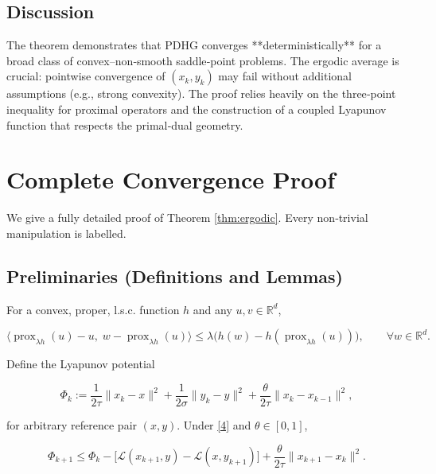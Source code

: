 \documentclass{article}
\begin{document}
\subsection*{Discussion}
The theorem demonstrates that PDHG converges **deterministically** for a broad class of convex–non‑smooth saddle‑point problems. The ergodic average is crucial: pointwise convergence of \((x_{k},y_{k})\) may fail without additional assumptions (e.g., strong convexity). The proof relies heavily on the three‑point inequality for proximal operators and the construction of a coupled Lyapunov function that respects the primal‑dual geometry.

\newpage
\section*{Complete Convergence Proof}
We give a fully detailed proof of Theorem \ref{thm:ergodic}. Every non‑trivial manipulation is labelled.

\subsection*{Preliminaries (Definitions and Lemmas)}
\begin{definition}\label{def:three}
For a convex, proper, l.s.c. function \(h\) and any \(u,v\in\mathbb{R}^{d}\),

\[
\langle \operatorname{prox}_{\lambda h}(u)-u,\; w-\operatorname{prox}_{\lambda h}(u)\rangle
\le
\lambda\bigl(h(w)-h(\operatorname{prox}_{\lambda h}(u))\bigr),
\qquad\forall w\in\mathbb{R}^{d}.
\tag{7}
\]
\end{definition}

\begin{lemma}\label{lem:lyap}
Define the Lyapunov potential  

\[
\Phi_{k}:=
\frac{1}{2\tau}\|x_{k}-x\|^{2}
+\frac{1}{2\sigma}\|y_{k}-y\|^{2}
+\frac{\theta}{2\tau}\|x_{k}-x_{k-1}\|^{2},
\tag{8}
\]

for arbitrary reference pair \((x,y)\).  
Under \eqref{4} and \(\theta\in[0,1]\),

\[
\boxed{\Phi_{k+1}\le \Phi_{k}
      -\bigl[\mathcal{L}(x_{k+1},y)-\mathcal{L}(x,y_{k+1})\bigr]
      +\frac{\theta}{2\tau}\|x_{k+1}-x_{k}\|^{2}}.
\tag{9}
\]
\end{lemma}
\end{document}
